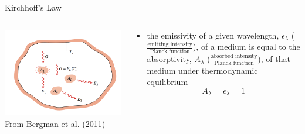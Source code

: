 \begin{frame}{Kirchhoff's Law}
\begin{columns}[T]
    \begin{column}{.4\textwidth}
    \begin{minipage}[c][0.8\textheight][c]{\linewidth}
    \includegraphics[width=1\textwidth]{fig14.png}\\
    \centering \small From Bergman et al. (2011)
    \end{minipage}
    \end{column}
    \begin{column}{.6\textwidth}
    \begin{minipage}[c][0.8\textheight][c]{\linewidth}
   \begin{itemize}
   	\item the emissivity of a given wavelength, $\epsilon_\lambda$ ($\frac{\text{emitting intensity}}{\text{Planck function}}$), of a medium is equal to the absorptivity, $A_\lambda$ ($\frac{\text{absorbed intensity}}{\text{Planck function}}$), of that medium under thermodynamic equilibrium
   	$$A_\lambda = \epsilon_\lambda = 1$$
   \end{itemize}
      \end{minipage}
    \end{column}
  \end{columns} 
\end{frame}

